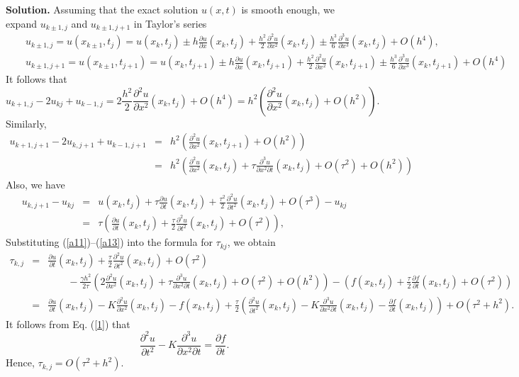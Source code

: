 \documentclass[10pt]{article}
\def\pr{{\partial}}
\begin{document}
\vskip 0.5cm \noindent
{\bf Solution.} Assuming that the exact
solution $u(x,t)$ is smooth enough, we expand $u_{k\pm 1,j}$ and
$u_{k\pm 1,j+1}$ in Taylor's series
\begin{eqnarray}
&&u_{k\pm 1,j}=u(x_{k\pm 1},t_{j})=u(x_{k},t_{j})\pm h\frac{\pr
u}{\pr x}(x_{k},t_{j}) + \frac{h^{2}}{2}\frac{\pr^{2} u}{\pr
x^{2}}(x_{k},t_{j})\pm
\frac{h^{3}}{6}\frac{\pr^{3} u}{\pr x^{3}}(x_{k},t_{j}) +O(h^{4}), \nonumber \\
&&u_{k\pm 1,j+1}=u(x_{k\pm 1},t_{j+1})=u(x_{k},t_{j+1})\pm
h\frac{\pr u}{\pr x}(x_{k},t_{j+1}) + \frac{h^{2}}{2}\frac{\pr^{2}
u}{\pr x^{2}}(x_{k},t_{j+1})\pm \frac{h^{3}}{6}\frac{\pr^{3} u}{\pr
x^{3}}(x_{k},t_{j+1}) +O(h^{4}) \nonumber
\end{eqnarray}
It follows that
\begin{equation}
u_{k+1,j}-2u_{kj}+u_{k-1,j}=
2\frac{h^{2}}{2}\frac{\pr^{2} u}{\pr x^{2}}(x_{k},t_{j})
+O(h^{4})=h^{2}\left(\frac{\pr^{2} u}{\pr
x^{2}}(x_{k},t_{j}) +O(h^{2})\right). \label{a11}
\end{equation}
Similarly,
\begin{eqnarray}
u_{k+1,j+1}-2u_{k,j+1}+u_{k-1,j+1}&=&h^{2}\left(\frac{\pr^{2} u}{\pr
x^{2}}(x_{k},t_{j+1})
+O(h^{2})\right) \nonumber \\
&=&h^{2}\left(\frac{\pr^{2} u}{\pr x^{2}}(x_{k},t_{j})+ \tau
\frac{\pr^{3} u}{\pr x^{2}\pr t}(x_{k},t_{j})+O(\tau^{2})
+O(h^{2})\right) \label{a12}
\end{eqnarray}
Also, we have
\begin{eqnarray}
u_{k,j+1}-u_{kj}&=&u(x_{k},t_{j})+ \tau\frac{\pr u}{\pr
t}(x_{k},t_{j}) + \frac{\tau^{2}}{2}\frac{\pr^{2} u}{\pr
t^{2}}(x_{k},t_{j})+
O(\tau^{3})-u_{kj} \nonumber \\
&=& \tau\left(\frac{\pr u}{\pr t}(x_{k},t_{j}) +
\frac{\tau}{2}\frac{\pr^{2} u}{\pr t^{2}}(x_{k},t_{j})
+O(\tau^{2})\right), \label{a13}
\end{eqnarray}
Substituting (\ref{a11})--(\ref{a13}) into the formula for $\tau_{kj}$, we obtain
\begin{eqnarray}
\tau_{k,j}&=& \frac{\pr u}{\pr t}(x_{k},t_{j})
+ \frac{\tau}{2}\frac{\pr^{2} u}{\pr t^{2}}(x_{k},t_{j}) +O(\tau^{2}) \nonumber \\
&& \quad\quad  -\frac{\gamma h^{2}}{2\tau} \left(2\frac{\pr^{2}
u}{\pr x^{2}}(x_{k},t_{j}) +\tau \frac{\pr^{3} u}{\pr x^{2}\pr
t}(x_{k},t_{j})+O(\tau^{2}) +O(h^{2})\right)
-\left(f(x_{k}, t_{j})+\frac{\tau}{2}\frac{\pr f}{\pr t}(x_{k}, t_{j})+O(\tau^{2})\right) \nonumber \\
&=& \frac{\pr u}{\pr t}(x_{k},t_{j})-K\frac{\pr^{2} u}{\pr
x^{2}}(x_{k},t_{j}) -f(x_{k},t_{j}) +
\frac{\tau}{2}\left(\frac{\pr^{2} u}{\pr t^{2}}(x_{k},t_{j})
-K\frac{\pr^{3} u}{\pr x^{2}\pr t}(x_{k},t_{j})-\frac{\pr
f}{\pr t}(x_{k}, t_{j})\right) +O(\tau^{2}+h^{2}). \nonumber
\end{eqnarray}
It follows from Eq. (\ref{1}) that
\[
\frac{\pr^{2} u}{\pr t^{2}}-K\frac{\pr^{3} u}{\pr x^{2}\pr
t}=\frac{\pr f}{\pr t}.
\]
Hence, $\tau_{k,j}=O(\tau^{2}+h^{2})$.
\end{document}
